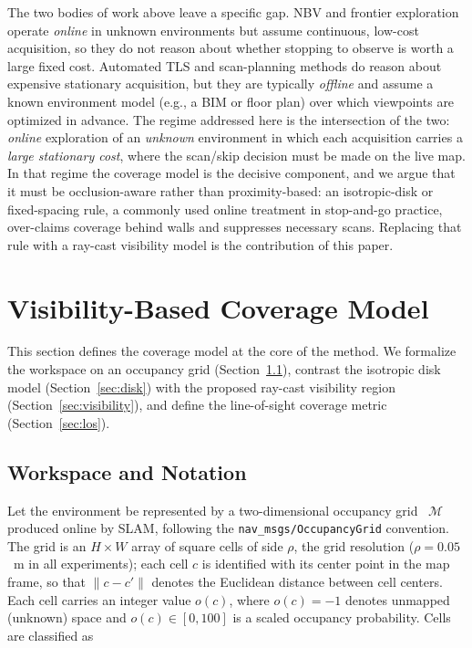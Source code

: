 \documentclass[sensors,article,submit,pdftex,moreauthors]{Definitions/mdpi}
\begin{document}
The two bodies of work above leave a specific gap. NBV and frontier exploration
operate \emph{online} in unknown environments but assume continuous,
low-cost acquisition, so they do not reason about whether stopping to observe is
worth a large fixed cost. Automated TLS and scan-planning methods do reason about
expensive stationary acquisition, but they are typically \emph{offline} and
assume a known environment model (e.g., a BIM or floor plan) over which viewpoints
are optimized in advance. The regime addressed here is the intersection of the
two: \emph{online} exploration of an \emph{unknown} environment in which each
acquisition carries a \emph{large stationary cost}, where the scan/skip decision
must be made on the live map. In that regime the coverage model is the decisive
component, and we argue that it must be occlusion-aware rather than
proximity-based: an isotropic-disk or fixed-spacing rule, a commonly used
online treatment in stop-and-go practice, over-claims coverage behind walls and
suppresses necessary scans. Replacing that rule with a ray-cast visibility model is the
contribution of this paper.


\section{Visibility-Based Coverage Model}
\label{sec:coverage}

This section defines the coverage model at the core of the method. We formalize
the workspace on an occupancy grid (Section~\ref{sec:notation}), contrast the
isotropic disk model (Section~\ref{sec:disk}) with the proposed ray-cast
visibility region (Section~\ref{sec:visibility}), and define the line-of-sight
coverage metric (Section~\ref{sec:los}).

\subsection{Workspace and Notation}
\label{sec:notation}

Let the environment be represented by a two-dimensional occupancy
grid~\cite{elfes1989,thrun2005} $\mathcal{M}$ produced online by SLAM,
following the \texttt{nav\_msgs/OccupancyGrid}
convention. The grid is an $H\times W$ array of square cells of side $\rho$,
the grid resolution ($\rho=0.05$~m in all experiments); each cell $c$ is
identified with its center point in the map frame, so that
$\lVert c-c'\rVert$ denotes the Euclidean distance between cell centers. Each
cell carries an integer value $o(c)$, where $o(c)=-1$ denotes unmapped
(unknown) space and $o(c)\in[0,100]$ is a scaled occupancy probability. Cells
are classified as
\end{document}

